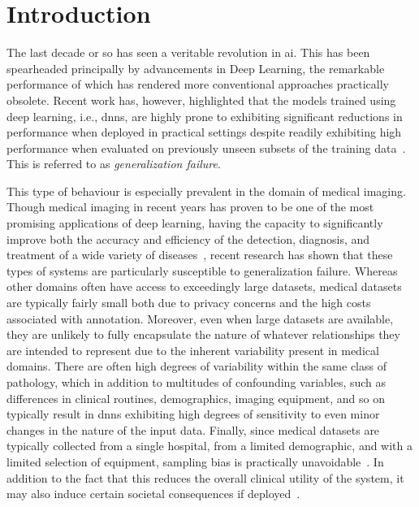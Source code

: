     \chapter{Introduction}\label{introduction}

    The last decade or so has seen a veritable revolution in \gls{ai}. This has been spearheaded principally by advancements in Deep Learning, the remarkable performance of which has rendered more conventional approaches practically obsolete. Recent work has, however, highlighted that the models trained using deep learning, i.e., \glspl{dnn}, are highly prone to exhibiting significant reductions in performance when deployed in practical settings despite readily exhibiting high performance when evaluated on previously unseen subsets of the training data~\cite{damour2020underspecification, shortcut_learning, noise_robustness, corruption_robustness}. This is referred to as \textit{generalization failure}. 
    

    This type of behaviour is especially prevalent in the domain of medical imaging. Though medical imaging in recent years has proven to be one of the most promising applications of deep learning, having the capacity to significantly improve both the accuracy and efficiency of the detection, diagnosis, and treatment of a wide variety of diseases~\cite{dl_medical_imaging}, recent research has shown that these types of systems are particularly susceptible to generalization failure. Whereas other domains often have access to exceedingly large datasets, medical datasets are typically fairly small both due to privacy concerns and the high costs associated with annotation. Moreover, even when large datasets are available, they are unlikely to fully encapsulate the nature of whatever relationships they are intended to represent due to the inherent variability present in medical domains. There are often high degrees of variability within the same class of pathology, which in addition to multitudes of confounding variables, such as differences in clinical routines, demographics, imaging equipment, and so on typically result in \glspl{dnn} exhibiting high degrees of sensitivity to even minor changes in the nature of the input data. Finally, since medical datasets are typically collected from a single hospital, from a limited demographic, and with a limited selection of equipment, sampling bias is practically unavoidable~\cite{bias, bias2}. In addition to the fact that this reduces the overall clinical utility of the system, it may also induce certain societal consequences if deployed~\cite{social_consequence_1}. 

